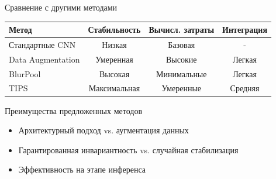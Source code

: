 \documentclass[aspectratio=169]{beamer}
\begin{document}
\begin{frame}{Сравнение с другими методами}
    \begin{table}[h]
    \centering
    \small
    \begin{tabular}{|l|c|c|c|}
    \hline
    \textbf{Метод} & \textbf{Стабильность} & \textbf{Вычисл. затраты} & \textbf{Интеграция} \\
    \hline
    Стандартные CNN & Низкая & Базовая & - \\
    Data Augmentation & Умеренная & Высокие & Легкая \\
    BlurPool & Высокая & Минимальные & Легкая \\
    TIPS & Максимальная & Умеренные & Средняя \\
    \hline
    \end{tabular}
    \end{table}
    
    \begin{block}{Преимущества предложенных методов}
        \begin{itemize}
            \item Архитектурный подход vs. аугментация данных
            \item Гарантированная инвариантность vs. случайная стабилизация
            \item Эффективность на этапе инференса
        \end{itemize}
    \end{block}
\end{frame}
\end{document}
